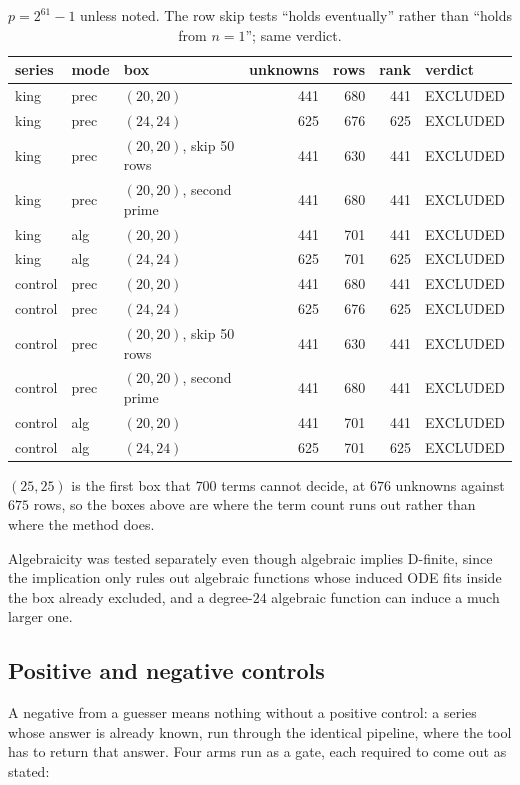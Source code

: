 \documentclass[11pt]{article}
\begin{document}
\begin{table}[H]
\centering\small
\begin{tabular}{l l l r r r l}
\toprule
series & mode & box & unknowns & rows & rank & verdict \\
\midrule
king    & prec & $(20,20)$ & 441 & 680 & 441 & EXCLUDED \\
king    & prec & $(24,24)$ & 625 & 676 & 625 & EXCLUDED \\
king    & prec & $(20,20)$, skip 50 rows & 441 & 630 & 441 & EXCLUDED \\
king    & prec & $(20,20)$, second prime & 441 & 680 & 441 & EXCLUDED \\
king    & alg  & $(20,20)$ & 441 & 701 & 441 & EXCLUDED \\
king    & alg  & $(24,24)$ & 625 & 701 & 625 & EXCLUDED \\
control & prec & $(20,20)$ & 441 & 680 & 441 & EXCLUDED \\
control & prec & $(24,24)$ & 625 & 676 & 625 & EXCLUDED \\
control & prec & $(20,20)$, skip 50 rows & 441 & 630 & 441 & EXCLUDED \\
control & prec & $(20,20)$, second prime & 441 & 680 & 441 & EXCLUDED \\
control & alg  & $(20,20)$ & 441 & 701 & 441 & EXCLUDED \\
control & alg  & $(24,24)$ & 625 & 701 & 625 & EXCLUDED \\
\bottomrule
\end{tabular}
\caption{$p = 2^{61}-1$ unless noted. The row skip tests ``holds eventually''
rather than ``holds from $n=1$''; same verdict.}
\label{tab:excl}
\end{table}

$(25,25)$ is the first box that $700$ terms cannot decide, at $676$ unknowns
against $675$ rows, so the boxes above are where the term count runs out rather
than where the method does.

Algebraicity was tested separately even though algebraic implies D-finite, since
the implication only rules out algebraic functions whose induced ODE fits inside
the box already excluded, and a degree-$24$ algebraic function can induce a much
larger one.

\subsection{Positive and negative controls}

A negative from a guesser means nothing without a positive control: a series
whose answer is already known, run through the identical pipeline, where the
tool has to return that answer. Four arms run as a gate, each required to come
out as stated:
\end{document}
